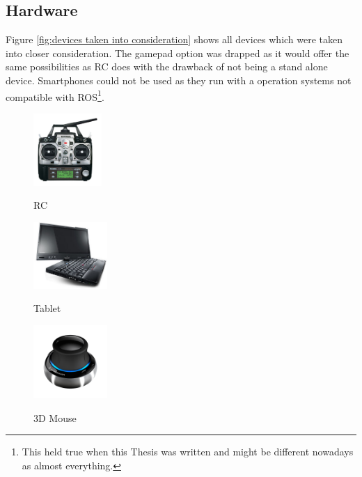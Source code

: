 \subsection{Hardware}
\label{sub:hardware}

Figure \ref{fig:devices taken into consideration} shows all devices which were taken into closer consideration. The gamepad option was drapped as it would offer the same possibilities as RC does with the drawback of not being a stand alone device. Smartphones could not be used as they run with a operation systems not compatible with \textsc{ROS}\footnote{This held true when this Thesis was written and might be different nowadays as almost everything.}.

\begin{figure}[h]		
	\small{
		\begin{center}
			\parbox[b]{0.25\textwidth}{\includegraphics[width=0.23\textwidth]{futaba_7C_radio}
			\begin{center}RC \end{center}}
			\hspace{0.05\textwidth}
			\parbox[b]{0.25\textwidth}{\includegraphics[width=0.25\textwidth]{x220t_hero}
			\begin{center}Tablet \end{center}}
			\hspace{0.05 \textwidth}
			\parbox[b]{0.25\textwidth}{\includegraphics[width=0.25\textwidth]{3dx_productimage}
			\begin{center}3D Mouse \end{center}}			

\end{center}}
\end{figure}
